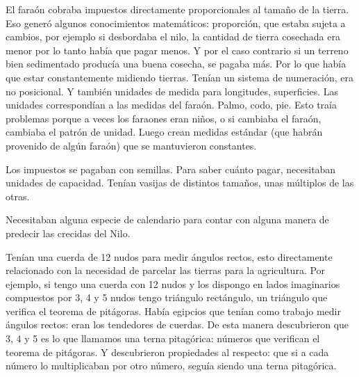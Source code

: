 El faraón cobraba impuestos directamente proporcionales al tamaño de la tierra. Eso generó algunos conocimientos matemáticos: proporción, que estaba sujeta a cambios, por ejemplo si desbordaba el nilo, la cantidad de tierra cosechada era menor por lo tanto había que pagar menos. Y por el caso contrario si un terreno bien sedimentado producía una buena cosecha, se pagaba más. Por lo que había que estar constantemente midiendo tierras. 
Tenían un sistema de numeración, era no posicional. Y también unidades de medida para longitudes, superficies. Las unidades correspondían a las medidas del faraón. Palmo, codo, pie. Esto traía problemas porque a veces los faraones eran niños, o si cambiaba el faraón, cambiaba el patrón de unidad. Luego crean medidas estándar (que habrán provenido de algún faraón) que se mantuvieron constantes. 

Los impuestos se pagaban con semillas. Para saber cuánto pagar, necesitaban unidades de capacidad. Tenían vasijas de distintos tamaños, unas múltiplos de las otras.

Necesitaban alguna especie de calendario para contar con alguna manera de predecir las crecidas del Nilo. 

Tenían una cuerda de 12 nudos para medir ángulos rectos, esto directamente relacionado con la necesidad de parcelar las tierras para la agricultura. Por ejemplo, si tengo una cuerda con 12 nudos y los dispongo en lados imaginarios compuestos por 3, 4 y 5 nudos tengo triángulo rectángulo, un triángulo que verifica el teorema de pitágoras. Había egipcios que tenían como trabajo medir ángulos rectos: eran los tendedores de cuerdas. De esta manera descubrieron que 3, 4 y 5 es lo que llamamos una terna pitagórica: números que verifican el teorema de pitágoras. Y descubrieron propiedades al respecto: que si a cada número lo multiplicaban por otro número, seguía siendo una terna pitagórica.

